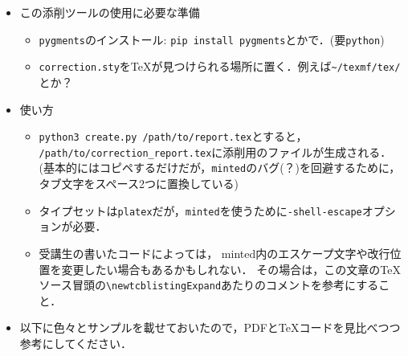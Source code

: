 \documentclass[dvipdfmx]{jsarticle}
\begin{document}
\begin{itemize}
  \item この添削ツールの使用に必要な準備
    \begin{itemize}
      \item \verb|pygments|のインストール: \verb|pip install pygments|とかで．(要\verb|python|)
      \item \verb|correction.sty|を\TeX が見つけられる場所に置く．例えば\verb|~/texmf/tex/|とか？
    \end{itemize}
  \item 使い方
    \begin{itemize}
      \item \verb|python3 create.py /path/to/report.tex|とすると，
        \verb|/path/to/correction_report.tex|に添削用のファイルが生成される．
        (基本的にはコピペするだけだが，\verb|minted|のバグ(？)を回避するために，タブ文字をスペース2つに置換している)
      \item タイプセットは\verb|platex|だが，\verb|minted|を使うために\verb|-shell-escape|オプションが必要．
      \item 受講生の書いたコードによっては，
        minted内のエスケープ文字や改行位置を変更したい場合もあるかもしれない．
        その場合は，この文章の\TeX ソース冒頭の\verb|\newtcblistingExpand|あたりのコメントを参考にすること．

    \end{itemize}
  \item 以下に色々とサンプルを載せておいたので，PDFと\TeX コードを見比べつつ参考にしてください．
\end{itemize}

\vspace{30pt}

\end{document}
